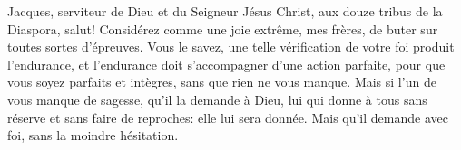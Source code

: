 Jacques, serviteur de Dieu et du Seigneur Jésus Christ,
	aux douze tribus de la Diaspora, salut!
Considérez comme une joie extrême, mes frères,
	de buter sur toutes sortes d’épreuves.
Vous le savez, une telle vérification de votre foi produit l’endurance,
	et l’endurance doit s’accompagner d’une action parfaite,
	pour que vous soyez parfaits et intègres, sans que rien ne vous manque.
Mais si l’un de vous manque de sagesse, qu’il la demande à Dieu,
	lui qui donne à tous sans réserve et sans faire de reproches:
	elle lui sera donnée.
Mais qu’il demande avec foi, sans la moindre hésitation.
